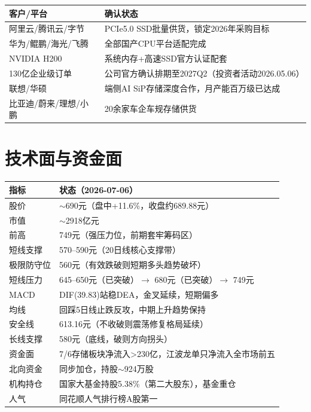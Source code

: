 \documentclass[a4paper,11pt,fontset=none]{ctexart}
\begin{document}
\begin{tabularx}{\textwidth}{L{3cm}X}
\toprule
\textbf{客户/平台} & \textbf{确认状态} \\
\midrule
阿里云/腾讯云/字节 & PCIe5.0 SSD批量供货，锁定2026年采购目标 \\
华为/鲲鹏/海光/飞腾 & 全部国产CPU平台适配完成 \\
NVIDIA H200 & 系统内存+高速SSD官方认证配套 \\
130亿企业级订单 & 公司官方确认排期至2027Q2（投资者活动2026.05.06） \\
联想/华硕 & 端侧AI SiP存储深度合作，月产能百万级已达成 \\
比亚迪/蔚来/理想/小鹏 & 20余家车企车规存储供货 \\
\bottomrule
\end{tabularx}

\section{技术面与资金面}

\begin{tabularx}{\textwidth}{L{3cm}X}
\toprule
\textbf{指标} & \textbf{状态（2026-07-06）} \\
\midrule
股价 & $\sim$690元（盘中+11.6\%，收盘约689.88元） \\
市值 & $\sim$2918亿元 \\
前高 & 749元（强压力位，前期套牢筹码区） \\
短线支撑 & 570--590元（20日线核心支撑带） \\
极限防守位 & 560元（有效跌破则短期多头趋势破坏） \\
短线压力 & 645--650元（已突破）$\to$ 680元（已突破）$\to$ 749元 \\
MACD & DIF(39.83)站稳DEA，金叉延续，短期偏多 \\
均线 & 回踩5日线止跌反攻，中期上升趋势保持 \\
安全线 & 613.16元（不收破则震荡修复格局延续） \\
长线支撑 & 580元（底线，破则方向拐头） \\
资金面 & 7/6存储板块净流入>230亿，江波龙单只净流入全市场前五 \\
北向资金 & 同步加仓，持股$\sim$924万股 \\
机构持仓 & 国家大基金持股5.38\%（第二大股东），基金重仓 \\
人气 & 同花顺人气排行榜A股第一 \\
\bottomrule
\end{tabularx}
\end{document}
